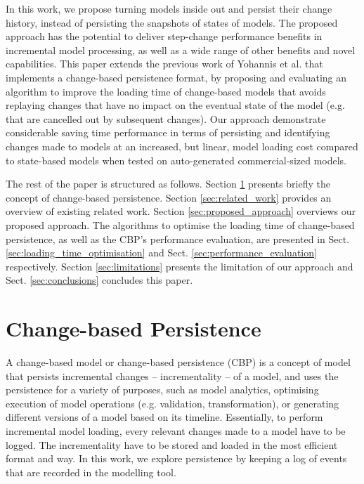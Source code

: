 \documentclass{llncs}
\begin{document}
In this work, we propose turning models inside out and persist their change history, instead of persisting the snapshots of states of models. The proposed approach has the potential to deliver step-change performance benefits in incremental model processing, as well as a wide range of other benefits and novel capabilities. This paper extends the previous work of Yohannis et al. \cite{yohannis2017turning} that implements a change-based persistence format, by proposing and evaluating an algorithm to improve the loading time of change-based models that avoids replaying changes that have no impact on the eventual state of the model (e.g. that are cancelled out by subsequent changes). Our approach demonstrate considerable saving time performance in terms of persisting and identifying changes made to models at an increased, but linear, model loading cost compared to state-based models when tested on auto-generated commercial-sized models.

The rest of the paper is structured as follows. Section \ref{sec:change_based_persistence} presents briefly the concept of change-based persistence. Section \ref{sec:related_work} provides an overview of existing related work. Section \ref{sec:proposed_approach} overviews our proposed approach. The algorithms to optimise the loading time of change-based persistence, as well as the CBP's performance evaluation, are presented in Sect. \ref{sec:loading_time_optimisation} and Sect. \ref{sec:performance_evaluation} respectively. 
Section \ref{sec:limitations} presents the limitation of our approach and Sect. \ref{sec:conclusions} concludes this paper.

\section{Change-based Persistence}
\label{sec:change_based_persistence}
A change-based model or change-based persistence (CBP) is a concept of model that persists incremental changes -- incrementality -- of a model, and uses the persistence for a variety of purposes, such as model analytics, optimising execution of model operations (e.g. validation, transformation), or generating different versions of a model based on its timeline. Essentially, to perform incremental model loading, every relevant changes made to a model have to be logged. The incrementality have to be stored and loaded in the most efficient format and way. In this work, we explore persistence by keeping a log of events that are recorded in the modelling tool.
\end{document}
